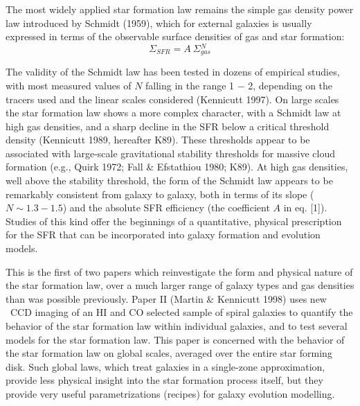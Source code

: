 The most widely applied star formation law remains the simple gas density 
power law introduced by Schmidt (1959), which for external galaxies is 
usually expressed in terms of the observable surface densities of gas and 
star formation: 
\begin{equation} 
\Sigma_{SFR} = A~\Sigma{_{gas}^N} 
\end{equation}

\noindent
The validity of the Schmidt law has been tested in dozens of 
empirical studies, with most measured values of $N$ falling in the range 
1 $-$ 2, depending on the tracers used and the linear scales considered 
(Kennicutt 1997).  On large scales the star 
formation law shows a more complex character, with a Schmidt law at high 
gas densities, and a sharp decline in the SFR below a critical threshold 
density (Kennicutt 1989, hereafter K89).  These thresholds appear to be 
associated with large-scale gravitational stability thresholds for massive 
cloud formation (e.g., Quirk 1972; Fall \& Efstathiou 1980; K89).  
At high gas densities, well above the 
stability threshold, the form of the Schmidt law appears to be remarkably 
consistent from galaxy to galaxy, both in terms of its slope ($N \sim 1.3 
- 1.5$) and the absolute SFR efficiency (the coefficient $A$ in eq. [1]).  
Studies of this kind 
offer the beginnings of a quantitative, physical prescription for the SFR 
that can be incorporated into galaxy formation and evolution models.

This is the first of two papers which reinvestigate the form and physical 
nature of the star formation law, over a much larger range of galaxy types 
and gas densities than was possible previously.  Paper II (Martin \& 
Kennicutt 1998) uses new \halpha\ CCD imaging of an HI and CO 
selected sample of spiral galaxies to quantify the behavior of the 
star formation law within individual galaxies, and to test several 
models for the star formation law.  This paper is 
concerned with the behavior of the star formation law on global scales, 
averaged over the entire star forming disk.  Such global laws, which treat 
galaxies in a single-zone approximation, provide less physical insight 
into the star formation process itself, but they provide very useful 
parametrizations (recipes) for galaxy evolution modelling.  

